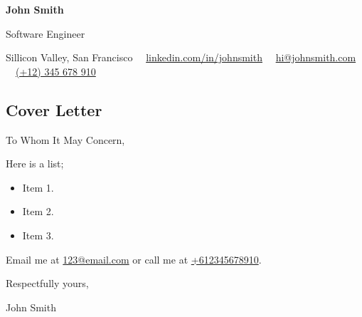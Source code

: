 \documentclass[10pt,a4paper]{article}
\begin{document}

\begin{center}
	{\LARGE \textbf{John Smith}}\vspace{0.2cm}
			
	{\large Software Engineer}\vspace{0.2cm}
			
	\faHome Sillicon Valley, San Francisco \ \
	\faLinkedin\href{https://linkedin.com/in/johnsmith}{linkedin.com/in/johnsmith} \ \
	\faEnvelope\href{mailto:hi@johnsmith.com}{hi@johnsmith.com} \ \
	\faMobile\href{tel:+12345678910}{(+12) 345 678 910} \ \
\end{center}



\subsection*{\textcolor{accent}{\Large Cover Letter  \sout{\hfill}}}

To Whom It May Concern,

\lipsum[1]
	
\lipsum[2]

Here is a list;
\begin{itemize}
	\item Item 1.
	\item Item 2.
	\item Item 3.
\end{itemize}

\lipsum[3]

Email me at \href{mailto:123@email.com}{123@email.com} or call me at \href{tel:+612345678910}{+612345678910}.

Respectfully yours,

\vspace{1cm}

John Smith
\end{document}
